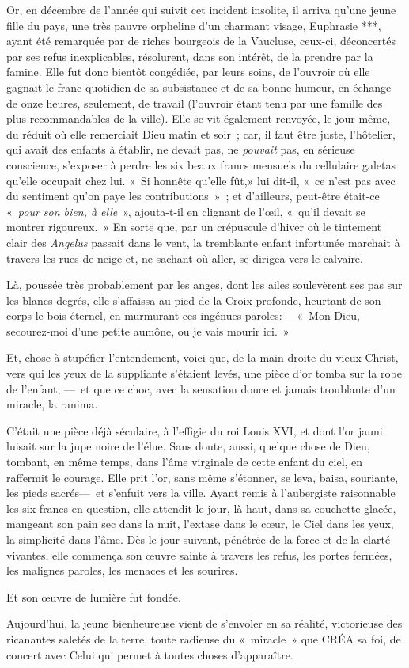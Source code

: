 \documentclass[french,twoside]{book} %
\begin{document}
Or, en décembre de l’année qui suivit cet incident   insolite, il arriva qu’une jeune fille du pays, une très pauvre orpheline d’un charmant visage, Euphrasie ***, ayant été remarquée par de riches bourgeois de la Vaucluse, ceux-ci, déconcertés par ses refus inexplicables, résolurent, dans son intérêt, de la prendre par la famine. Elle fut donc bientôt congédiée, par leurs soins, de l’ouvroir où elle gagnait le franc quotidien de sa subsistance et de sa bonne humeur, en échange de onze heures, seulement, de travail (l’ouvroir étant tenu par une famille des plus recommandables de la ville). Elle se vit également renvoyée, le jour même, du réduit où elle remerciait Dieu matin et soir ; car, il faut être juste, l’hôtelier, qui avait des enfants à établir, ne devait pas, ne \emph{pouvait} pas, en sérieuse conscience, s’exposer à perdre les six beaux francs mensuels du cellulaire galetas qu’elle occupait chez lui. « Si honnête qu’elle fût,» lui dit-il, « ce n’est pas avec du sentiment qu’on paye les contributions » ; et d’ailleurs, peut-être était-ce « \emph{pour son bien, à elle} », ajouta-t-il en clignant de l’œil, « qu’il devait se montrer   rigoureux. » En sorte que, par un crépuscule d’hiver où le tintement clair des \emph{Angelus} passait dans le vent, la tremblante enfant infortunée marchait à travers les rues de neige et, ne sachant où aller, se dirigea vers le calvaire.\par
Là, poussée très probablement par les anges, dont les ailes soulevèrent ses pas sur les blancs degrés, elle s’affaissa au pied de la Croix profonde, heurtant de son corps le bois éternel, en murmurant ces ingénues paroles: —« Mon Dieu, secourez-moi d’une petite aumône, ou je vais mourir ici. »\par
Et, chose à stupéfier l’entendement, voici que, de la main droite du vieux Christ, vers qui les yeux de la suppliante s’étaient levés, une pièce d’or tomba sur la robe de l’enfant, — et que ce choc, avec la sensation douce et jamais troublante d’un miracle, la ranima.\par
C’était une pièce déjà séculaire, à l’effigie du roi Louis XVI, et dont l’or jauni luisait sur la jupe noire de l’élue. Sans doute, aussi, quelque chose de Dieu, tombant, en même temps, dans l’âme virginale de cette enfant du ciel, en   raffermit le courage. Elle prit l’or, sans même s’étonner, se leva, baisa, souriante, les pieds sacrés— et s’enfuit vers la ville. Ayant remis à l’aubergiste raisonnable les six francs en question, elle attendit le jour, là-haut, dans sa couchette glacée, mangeant son pain sec dans la nuit, l’extase dans le cœur, le Ciel dans les yeux, la simplicité dans l’âme. Dès le jour suivant, pénétrée de la force et de la clarté vivantes, elle commença son œuvre sainte à travers les refus, les portes fermées, les malignes paroles, les menaces et les sourires.\par
Et son œuvre de lumière fut fondée.\par
Aujourd’hui, la jeune bienheureuse vient de s’envoler en sa réalité, victorieuse des ricanantes saletés de la terre, toute radieuse du « miracle » que CRÉA sa foi, de concert avec Celui qui permet à toutes choses d’apparaître.
\end{document}
